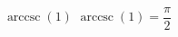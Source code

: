  {$\operatorname{arccsc} \left( 1 \right)$ }
{ $\operatorname{arccsc} \left( 1 \right) = \dfrac{\pi}{2}$ }
